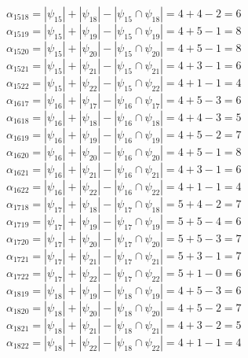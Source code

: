 \documentclass[a4paper,12pt]{article}
\begin{document}
$\alpha_{1518} = |\psi_{15}| + |\psi_{18}| - |\psi_{15} \cap \psi_{18}| = 4 + 4 - 2 = 6$\\
$\alpha_{1519} = |\psi_{15}| + |\psi_{19}| - |\psi_{15} \cap \psi_{19}| = 4 + 5 - 1 = 8$\\
$\alpha_{1520} = |\psi_{15}| + |\psi_{20}| - |\psi_{15} \cap \psi_{20}| = 4 + 5 - 1 = 8$\\
$\alpha_{1521} = |\psi_{15}| + |\psi_{21}| - |\psi_{15} \cap \psi_{21}| = 4 + 3 - 1 = 6$\\
$\alpha_{1522} = |\psi_{15}| + |\psi_{22}| - |\psi_{15} \cap \psi_{22}| = 4 + 1 - 1 = 4$\\
$\alpha_{1617} = |\psi_{16}| + |\psi_{17}| - |\psi_{16} \cap \psi_{17}| = 4 + 5 - 3 = 6$\\
$\alpha_{1618} = |\psi_{16}| + |\psi_{18}| - |\psi_{16} \cap \psi_{18}| = 4 + 4 - 3 = 5$\\
$\alpha_{1619} = |\psi_{16}| + |\psi_{19}| - |\psi_{16} \cap \psi_{19}| = 4 + 5 - 2 = 7$\\
$\alpha_{1620} = |\psi_{16}| + |\psi_{20}| - |\psi_{16} \cap \psi_{20}| = 4 + 5 - 1 = 8$\\
$\alpha_{1621} = |\psi_{16}| + |\psi_{21}| - |\psi_{16} \cap \psi_{21}| = 4 + 3 - 1 = 6$\\
$\alpha_{1622} = |\psi_{16}| + |\psi_{22}| - |\psi_{16} \cap \psi_{22}| = 4 + 1 - 1 = 4$\\
$\alpha_{1718} = |\psi_{17}| + |\psi_{18}| - |\psi_{17} \cap \psi_{18}| = 5 + 4 - 2 = 7$\\
$\alpha_{1719} = |\psi_{17}| + |\psi_{19}| - |\psi_{17} \cap \psi_{19}| = 5 + 5 - 4 = 6$\\
$\alpha_{1720} = |\psi_{17}| + |\psi_{20}| - |\psi_{17} \cap \psi_{20}| = 5 + 5 - 3 = 7$\\
$\alpha_{1721} = |\psi_{17}| + |\psi_{21}| - |\psi_{17} \cap \psi_{21}| = 5 + 3 - 1 = 7$\\
$\alpha_{1722} = |\psi_{17}| + |\psi_{22}| - |\psi_{17} \cap \psi_{22}| = 5 + 1 - 0 = 6$\\
$\alpha_{1819} = |\psi_{18}| + |\psi_{19}| - |\psi_{18} \cap \psi_{19}| = 4 + 5 - 3 = 6$\\
$\alpha_{1820} = |\psi_{18}| + |\psi_{20}| - |\psi_{18} \cap \psi_{20}| = 4 + 5 - 2 = 7$\\
$\alpha_{1821} = |\psi_{18}| + |\psi_{21}| - |\psi_{18} \cap \psi_{21}| = 4 + 3 - 2 = 5$\\
$\alpha_{1822} = |\psi_{18}| + |\psi_{22}| - |\psi_{18} \cap \psi_{22}| = 4 + 1 - 1 = 4$\\
\end{document}
